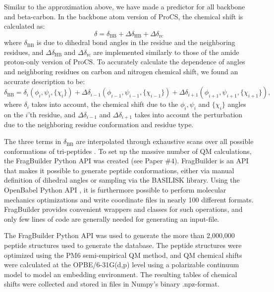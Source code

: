 Similar to the approximation above, we have made a predictor for all backbone and beta-carbon.
In the backbone atom version of ProCS, the chemical shift is calculated as:
\begin{equation}
    \delta = \delta_\mathrm{BB} + \Delta\delta_\mathrm{HB} + \Delta\delta_\mathrm{rc}
\end{equation}
where $\delta_\mathrm{BB}$ is due to dihedral bond angles in the residue and the neighboring residues, and $\Delta\delta_\mathrm{HB}$ and $\Delta\delta_\mathrm{rc}$ are implemented similarly to those of the amide proton-only version of ProCS.
To accurately calculate the dependence of angles and neighboring residues on carbon and nitrogen chemical shift, we found an accurate description to be:
\begin{equation}
    \delta_\mathrm{BB} = \delta_{i}(\phi_i,\psi_i, \{\chi_i\})
    + \Delta\delta_{i-1}(\phi_{i-1},\psi_{i-1}, \{\chi_{i-1}\})
    + \Delta\delta_{i+1}(\phi_{i+1},\psi_{i+1}, \{\chi_{i+1}\}),
\end{equation}
where $\delta_{i}$ takes into account, the chemical shift due to the $\phi_i,\psi_i$ and $\{\chi_i\}$ angles on the $i$'th residue, and $\Delta\delta_{i-1}$ and $\Delta\delta_{i+1}$ takes into account the perturbation due to the neighboring residue conformation and residue type.

The three terms in $\delta_\mathrm{BB}$ are interpolated through exhaustive scans over all possible conformations of tri-peptides
.
To set up the massive number of QM calculations, the FragBuilder Python API was created (see Paper \#4).
FragBuilder is an API that makes it possible to generate peptide conformations, either via manual definition of dihedral angles or sampling via the BASILISK library. 
Using the OpenBabel Python API \cite{Babel}, it is furthermore possible to perform molecular mechanics optimizations and write coordinate files in nearly 100 different formats.
FragBuilder provides convenient wrappers and classes for such operations, and only few lines of code are generally needed for generating an input-file.


The FragBuilder Python API was used to generate the more than 2,000,000 peptide structures used to generate the database.
The peptide structures were optimized using the PM6 semi-empirical QM method, and QM chemical shifts were calculated at the OPBE/6-31G(d,p) level using a polarizable continuum model to model an embedding environment.
The resulting tables of chemical shifts were collected and stored in files in Numpy's binary .npz-format\cite{numpy}.

